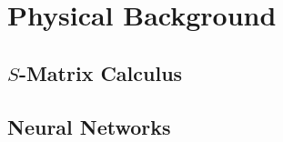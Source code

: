 \section{Physical Background}

\subsection{$S$-Matrix Calculus} \label{sec:s_mats}

\clearpage

\subsection{Neural Networks} \label{sec:NN_bg}

